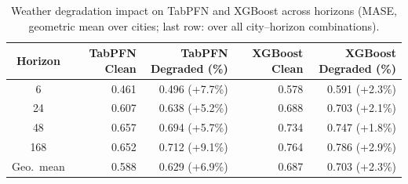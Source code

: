 \begin{table}
\centering
\caption{Weather degradation impact on TabPFN and XGBoost across horizons (MASE, geometric mean over cities; last row: over all city--horizon combinations).}
\label{tab:degradation_tabpfn_xgboost_by_horizon}
\begin{tabular}{crrrr}
\toprule
Horizon & TabPFN Clean & TabPFN Degraded (\%) & XGBoost Clean & XGBoost Degraded (\%) \\
\midrule
6 & 0.461 & 0.496 (+7.7\%) & 0.578 & 0.591 (+2.3\%) \\
24 & 0.607 & 0.638 (+5.2\%) & 0.688 & 0.703 (+2.1\%) \\
48 & 0.657 & 0.694 (+5.7\%) & 0.734 & 0.747 (+1.8\%) \\
168 & 0.652 & 0.712 (+9.1\%) & 0.764 & 0.786 (+2.9\%) \\
\midrule
Geo.\ mean & 0.588 & 0.629 (+6.9\%) & 0.687 & 0.703 (+2.3\%) \\
\bottomrule
\end{tabular}
\end{table}
